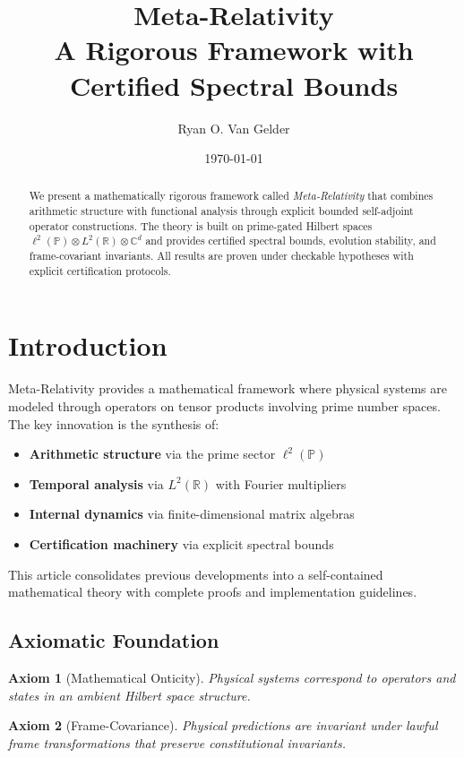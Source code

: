 \documentclass[10pt]{article}
\title{Meta-Relativity \\ A Rigorous Framework with Certified Spectral Bounds}
\author{Ryan O. Van Gelder}
\date{\today}
\newtheorem{axiom}{Axiom}
\begin{document}
\maketitle

\begin{abstract}
We present a mathematically rigorous framework called \emph{Meta-Relativity} that combines arithmetic structure with functional analysis through explicit bounded self-adjoint operator constructions. The theory is built on prime-gated Hilbert spaces $\ell^2(\mathbb{P}) \otimes L^2(\mathbb{R}) \otimes \mathbb{C}^d$ and provides certified spectral bounds, evolution stability, and frame-covariant invariants. All results are proven under checkable hypotheses with explicit certification protocols.
\end{abstract}

\section{Introduction}

Meta-Relativity provides a mathematical framework where physical systems are modeled through operators on tensor products involving prime number spaces. The key innovation is the synthesis of:
\begin{itemize}
    \item \textbf{Arithmetic structure} via the prime sector $\ell^2(\mathbb{P})$
    \item \textbf{Temporal analysis} via $L^2(\mathbb{R})$ with Fourier multipliers  
    \item \textbf{Internal dynamics} via finite-dimensional matrix algebras
    \item \textbf{Certification machinery} via explicit spectral bounds
\end{itemize}

This article consolidates previous developments into a self-contained mathematical theory with complete proofs and implementation guidelines.

\subsection{Axiomatic Foundation}

\begin{axiom}[Mathematical Onticity]
Physical systems correspond to operators and states in an ambient Hilbert space structure.
\end{axiom}

\begin{axiom}[Frame-Covariance] 
Physical predictions are invariant under lawful frame transformations that preserve constitutional invariants.
\end{axiom}
\end{document}
